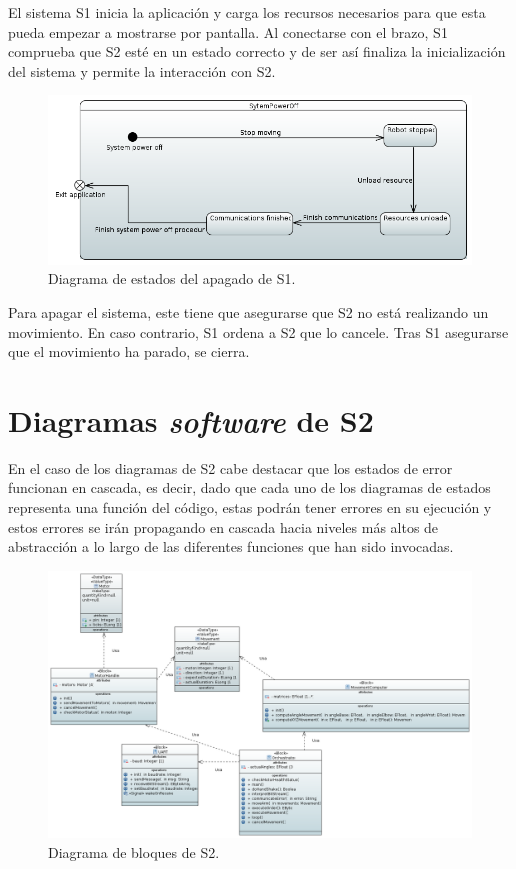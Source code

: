 El sistema \ac{S1} inicia la aplicación y carga los recursos necesarios para que esta pueda empezar a mostrarse por pantalla. Al conectarse con el brazo, \ac{S1} comprueba que \ac{S2} esté en un estado correcto y de ser así finaliza la inicialización del sistema y permite la interacción con \ac{S2}.

\begin{figure}[H]
    \centering
    \includegraphics[width=\linewidth]{pictures/S1SystemPowerOff.PNG}
    \caption{Diagrama de estados del apagado de \ac{S1}.}
    \label{fig:diagrama_estados_apagado_s1}
\end{figure}

Para apagar el sistema, este tiene que asegurarse que \ac{S2} no está realizando un movimiento. En caso contrario, \ac{S1} ordena a \ac{S2} que lo cancele. Tras \ac{S1} asegurarse que el movimiento ha parado, se cierra.

\section{Diagramas \textit{software} de S2}

En el caso de los diagramas de \ac{S2} cabe destacar que los estados de error funcionan en cascada, es decir, dado que cada uno de los diagramas de estados representa una función del código, estas podrán tener errores en su ejecución y estos errores se irán propagando en cascada hacia niveles más altos de abstracción a lo largo de las diferentes funciones que han sido invocadas.

\begin{figure}[H]
    \centering
    \includegraphics[width=\linewidth]{pictures/S2BlockDiagram.PNG}
    \caption{Diagrama de bloques de \ac{S2}.}
    \label{fig:diagrama_bloques_s2}
\end{figure}

